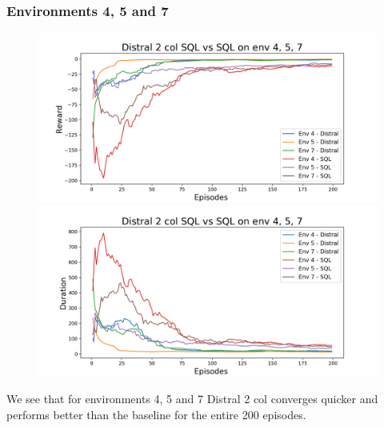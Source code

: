 \documentclass[12pt]{report}
\begin{document}
\subsubsection{Environments 4, 5 and 7}
\begin{figure}[H]
\centering
\begin{minipage}{.5\textwidth}
\centering
\includegraphics[width=\textwidth]{figs/d2_col_sql/d2_col_sql_4_5_7_rwd.png}
\end{minipage}%
\centering
\begin{minipage}{.5\textwidth}
\centering
\includegraphics[width=\textwidth]{figs/d2_col_sql/d2_col_sql_4_5_7_dur.png}
\end{minipage}%
\end{figure}
We see that for environments 4, 5 and 7 Distral 2 col converges quicker and performs better than the baseline for the entire 200 episodes.
\end{document}
